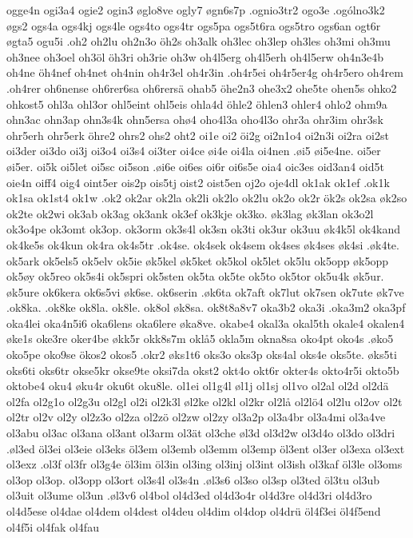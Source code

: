 {{ogge4n
ogi3a4
ogie2
ogin3
øglo8ve
ogly7
øgn6s7p
.ognio3tr2
ogo3e
.ogólno3k2
øgs2
ogs4a
ogs4kj
ogs4le
ogs4to
ogs4tr
ogs5pa
ogs5t6ra
ogs5tro
ogs6an
ogt6r
øgta5
ogu5i
.oh2
oh2lu
oh2n3o
öh2s
oh3alk
oh3lec
oh3lep
oh3les
oh3mi
oh3mu
oh3nee
oh3oel
oh3öl
öh3ri
oh3rie
oh3w
oh4l5erg
oh4l5erh
oh4l5erw
oh4n3e4b
oh4ne
öh4nef
oh4net
oh4nin
oh4r3el
oh4r3in
.oh4r5ei
oh4r5er4g
oh4r5ero
oh4rem
.oh4rer
oh6nense
oh6rer6sa
oh6rersä
ohab5
öhe2n3
ohe3x2
ohe5te
ohen5s
ohko2
ohkost5
ohl3a
ohl3or
ohl5eint
ohl5eis
ohla4d
öhle2
öhlen3
ohler4
ohlo2
ohm9a
ohn3ac
ohn3ap
ohn3s4k
ohn5ersa
ohø4
oho4l3a
oho4l3o
ohr3a
ohr3im
ohr3sk
ohr5erh
ohr5erk
öhre2
ohrs2
ohs2
oht2
oi1e
oi2
öi2g
oi2n1o4
oi2n3i
oi2ra
oi2st
oi3der
oi3do
oi3j
oi3o4
oi3s4
oi3ter
oi4ce
øi4e
oi4la
oi4nen
.øi5
øi5e4ne.
oi5er
øi5er.
oi5k
oi5let
oi5sc
oi5son
.øi6e
oi6es
oi6r
oi6s5e
oia4
oic3es
oid3an4
oid5t
oie4n
oiff4
oig4
oint5er
ois2p
ois5tj
oist2
oist5en
oj2o
oje4dl
ok1ak
ok1ef
.ok1k
ok1sa
ok1st4
ok1w
.ok2
ok2ar
ok2la
ok2li
ok2lo
ok2lu
ok2o
ok2r
ök2s
ok2sa
øk2so
ok2te
ok2wi
ok3ab
ok3ag
ok3ank
ok3ef
ok3kje
ok3ko.
øk3lag
øk3lan
ok3o2l
ok3o4pe
ok3omt
ok3op.
ok3orm
ok3s4l
ok3sn
ok3ti
ok3ur
ok3uu
øk4k5l
ok4kand
ok4ke5s
ok4kun
ok4ra
ok4s5tr
.ok4se.
ok4sek
ok4sem
ok4ses
øk4ses
øk4si
.øk4te.
ok5ark
ok5els5
ok5elv
ok5ie
øk5kel
øk5ket
ok5kol
ok5let
ok5lu
ok5opp
øk5opp
ok5øy
ok5reo
ok5s4i
ok5spri
ok5sten
ok5ta
ok5te
ok5to
ok5tor
ok5u4k
øk5ur.
øk5ure
ok6kera
ok6s5vi
øk6se.
ok6serin
.øk6ta
ok7aft
ok7lut
ok7sen
ok7ute
øk7ve
.ok8ka.
.ok8ke
ok8la.
ok8le.
ok8ol
øk8sa.
ok8t8a8v7
oka3b2
oka3i
.oka3m2
oka3pf
oka4lei
oka4n5i6
oka6lens
oka6lere
øka8ve.
okabe4
okal3a
okal5th
okale4
okalen4
øke1s
oke3re
oker4be
økk5r
okk8s7m
oklå5
okla5m
okna8sa
oko4pt
oko4s
.øko5
oko5pe
oko9se
ökos2
okos5
.okr2
øks1t6
oks3o
oks3p
oks4al
oks4e
oks5te.
øks5ti
oks6ti
oks6tr
okse5kr
okse9te
oksi7da
okst2
okt4o
okt6r
okter4s
okto4r5i
okto5b
oktobe4
oku4
øku4r
oku6t
oku8le.
ol1ei
ol1g4l
øl1j
ol1sj
ol1vo
ol2al
ol2d
ol2dä
ol2fa
ol2g1o
ol2g3u
ol2gl
ol2i
ol2k3l
øl2ke
ol2kl
ol2kr
ol2lå
ol2lö4
ol2lu
ol2ov
ol2t
ol2tr
ol2v
ol2y
ol2z3o
ol2za
ol2zö
ol2zw
ol2zy
ol3a2p
ol3a4br
ol3a4mi
ol3a4ve
ol3abu
ol3ac
ol3ana
ol3ant
ol3arm
ol3ät
ol3che
øl3d
ol3d2w
ol3d4o
ol3do
ol3dri
.øl3ed
öl3ei
ol3eie
ol3eks
öl3em
ol3emb
ol3emm
ol3emp
öl3ent
ol3er
ol3exa
ol3ext
ol3exz
.ol3f
ol3fr
ol3g4e
öl3im
öl3in
ol3ing
ol3inj
ol3int
ol3ish
ol3kaf
öl3le
ol3oms
ol3op
ol3op.
ol3opp
ol3ort
ol3s4l
ol3s4n
.øl3s6
ol3so
ol3sp
ol3ted
öl3tu
ol3ub
ol3uit
ol3ume
ol3un
.øl3v6
ol4bol
ol4d3ed
ol4d3o4r
ol4d3re
ol4d3ri
ol4d3ro
ol4d5ese
ol4dae
ol4dem
ol4dest
ol4deu
ol4dim
ol4dop
ol4drü
öl4f3ei
öl4f5end
ol4f5i
ol4fak
ol4fau
}}
